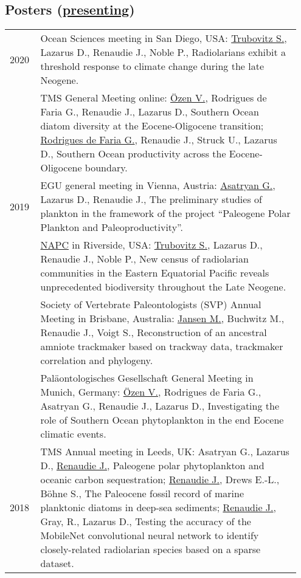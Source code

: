 \documentclass[11pt, a4paper]{article}
\begin{document}
\subsection[Posters]{Posters \textnormal{\footnotesize{(\underline{presenting})}}}
\begin{longtable}{@{}p{0.1\linewidth} P{0.85\linewidth}@{}}
2020 & Ocean Sciences meeting in San Diego, USA: \underline{Trubovitz S.}, Lazarus D., Renaudie J., Noble P., Radiolarians exhibit a threshold response to climate change during the late Neogene.\\
 & TMS General Meeting online: \underline{\"{O}zen V.}, Rodrigues de Faria G., Renaudie J., Lazarus D., Southern Ocean diatom diversity at the Eocene-Oligocene transition; \underline{Rodrigues de Faria G.}, Renaudie J., Struck U., Lazarus D., Southern Ocean productivity across the Eocene-Oligocene boundary.\\
2019 & EGU general meeting in Vienna, Austria: \underline{Asatryan G.}, Lazarus D., Renaudie J., The preliminary studies of plankton in the framework of the project ``Paleogene Polar Plankton and Paleoproductivity''.\\
& \href{https://escholarship.org/uc/item/6r18f8wn}{NAPC} in Riverside, USA: \underline{Trubovitz S.}, Lazarus D., Renaudie J., Noble P., New census of radiolarian communities in the Eastern Equatorial Pacific reveals unprecedented biodiversity throughout the Late Neogene.\\
& Society of Vertebrate Paleontologists (SVP) Annual Meeting in Brisbane, Australia: \underline{Jansen M.}, Buchwitz M., Renaudie J., Voigt S., Reconstruction of an ancestral amniote trackmaker based on trackway data, trackmaker correlation and phylogeny.\\
& Paläontologisches Gesellschaft General Meeting in Munich, Germany: \underline{\"{O}zen V.}, Rodrigues de Faria G., Asatryan G., Renaudie J., Lazarus D., Investigating the role of Southern Ocean phytoplankton in the end Eocene climatic events.\\
2018 & TMS Annual meeting in Leeds, UK: Asatryan G., Lazarus D., \underline{Renaudie J.}, Paleogene polar phytoplankton and oceanic carbon sequestration; \underline{Renaudie J.}, Drews E.-L., Böhne S., The Paleocene fossil record of marine planktonic diatoms in deep-sea sediments; \underline{Renaudie J.}, Gray, R., Lazarus D., Testing the accuracy of the MobileNet convolutional neural network to identify closely-related radiolarian species based on a sparse dataset.\\

\end{longtable}
\end{document}
